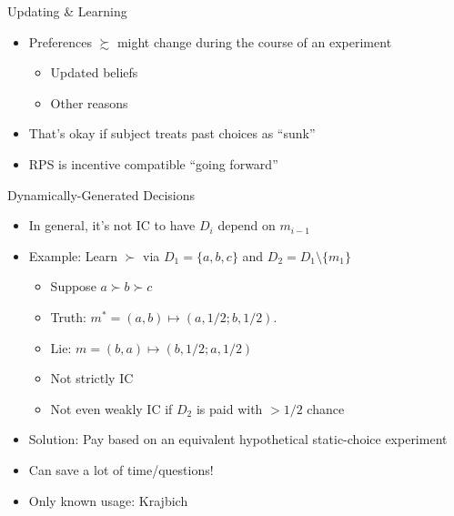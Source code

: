 \begin{frame}{Updating \& Learning}
    \begin{itemize}
        \item Preferences $\succsim$ might change during the course of an experiment
        \begin{itemize}
            \item Updated beliefs
            \item Other reasons
        \end{itemize}
        \item That's okay if subject treats past choices as ``sunk''
        \item RPS is incentive compatible ``going forward''
    \end{itemize}
\end{frame}
    

\begin{frame}{Dynamically-Generated Decisions}
\begin{itemize}
    \item In general, it's not IC to have $D_i$ depend on $m_{i-1}$
    \item Example: Learn $\succ$ via $D_1=\{a,b,c\}$ and $D_2=D_1\setminus \{m_1\}$
    \begin{itemize}
        \item Suppose $a\succ b \succ c$
        \item Truth: $m^*=(a,b)\mapsto (a,1/2;b,1/2)$.
        \item Lie: $m=(b,a)\mapsto (b,1/2;a,1/2)$
        \item Not strictly IC
        \item Not even weakly IC if $D_2$ is paid with $>1/2$ chance
    \end{itemize}
    \item Solution: Pay based on an equivalent hypothetical static-choice experiment
    \item Can save a lot of time/questions!
    \item Only known usage: Krajbich
\end{itemize}
\end{frame}

